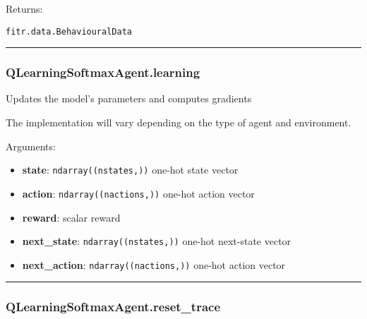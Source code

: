 Returns:

\texttt{fitr.data.BehaviouralData}

\begin{center}\rule{0.5\linewidth}{\linethickness}\end{center}

\subsubsection{QLearningSoftmaxAgent.learning}\label{qlearningsoftmaxagent.learning}

\begin{Shaded}
\begin{Highlighting}[]
\end{Highlighting}
\end{Shaded}

Updates the model's parameters and computes gradients

The implementation will vary depending on the type of agent and
environment.

Arguments:

\begin{itemize}
\tightlist
\item
  \textbf{state}: \texttt{ndarray((nstates,))} one-hot state vector
\item
  \textbf{action}: \texttt{ndarray((nactions,))} one-hot action vector
\item
  \textbf{reward}: scalar reward
\item
  \textbf{next\_state}: \texttt{ndarray((nstates,))} one-hot next-state
  vector
\item
  \textbf{next\_action}: \texttt{ndarray((nactions,))} one-hot action
  vector
\end{itemize}

\begin{center}\rule{0.5\linewidth}{\linethickness}\end{center}

\subsubsection{QLearningSoftmaxAgent.reset\_trace}\label{qlearningsoftmaxagent.reset_trace}

\begin{Shaded}
\begin{Highlighting}[]
\OperatorTok{=}\NormalTok{)}
\end{Highlighting}
\end{Shaded}

